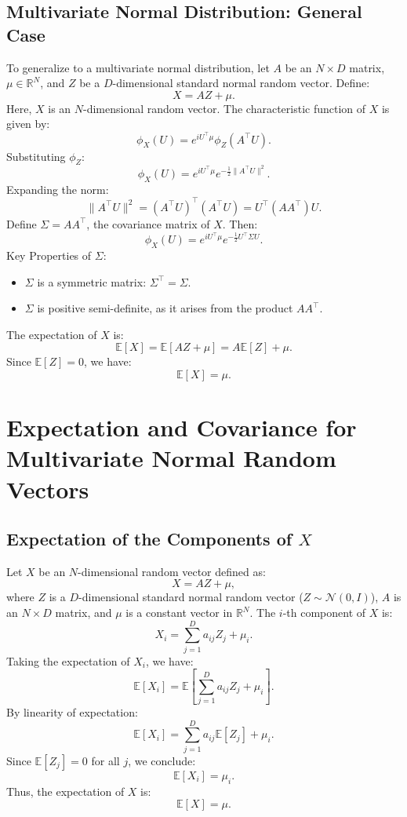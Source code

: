 \subsection{Multivariate Normal Distribution: General Case}

To generalize to a multivariate normal distribution, let \( A \) be an \( N \times D \) matrix, \( \mu \in \mathbb{R}^N \), and \( Z \) be a \( D \)-dimensional standard normal random vector. Define:
\[
X = A Z + \mu.
\]
Here, \( X \) is an \( N \)-dimensional random vector. \newline
The characteristic function of \( X \) is given by:
\[
\phi_X(U) = e^{i U^\top \mu} \phi_Z(A^\top U).
\]
Substituting \( \phi_Z \):
\[
\phi_X(U) = e^{i U^\top \mu} e^{-\frac{1}{2} \|A^\top U\|^2}.
\]
Expanding the norm:
\[
\|A^\top U\|^2 = (A^\top U)^\top (A^\top U) = U^\top (A A^\top) U.
\]
Define \( \Sigma = A A^\top \), the covariance matrix of \( X \). Then:
\[
\phi_X(U) = e^{i U^\top \mu} e^{-\frac{1}{2} U^\top \Sigma U}.
\]
Key Properties of \( \Sigma \):
\begin{itemize}
    \item \( \Sigma \) is a symmetric matrix: \( \Sigma^\top = \Sigma \).
    \item \( \Sigma \) is positive semi-definite, as it arises from the product \( A A^\top \).
\end{itemize}
The expectation of \( X \) is:
\[
\mathbb{E}[X] = \mathbb{E}[A Z + \mu] = A \mathbb{E}[Z] + \mu.
\]
Since \( \mathbb{E}[Z] = 0 \), we have:
\[
\mathbb{E}[X] = \mu.
\]

\section{Expectation and Covariance for Multivariate Normal Random Vectors}

\subsection{Expectation of the Components of \( X \)}
Let \( X \) be an \( N \)-dimensional random vector defined as:
\[
X = A Z + \mu,
\]
where \( Z \) is a \( D \)-dimensional standard normal random vector (\( Z \sim \mathcal{N}(0, I) \)), \( A \) is an \( N \times D \) matrix, and \( \mu \) is a constant vector in \( \mathbb{R}^N \). The \( i \)-th component of \( X \) is:
\[
X_i = \sum_{j=1}^D a_{ij} Z_j + \mu_i.
\]
Taking the expectation of \( X_i \), we have:
\[
\mathbb{E}[X_i] = \mathbb{E}\left[\sum_{j=1}^D a_{ij} Z_j + \mu_i \right].
\]
By linearity of expectation:
\[
\mathbb{E}[X_i] = \sum_{j=1}^D a_{ij} \mathbb{E}[Z_j] + \mu_i.
\]
Since \( \mathbb{E}[Z_j] = 0 \) for all \( j \), we conclude:
\[
\mathbb{E}[X_i] = \mu_i.
\]
Thus, the expectation of \( X \) is:
\[
\mathbb{E}[X] = \mu.
\]

